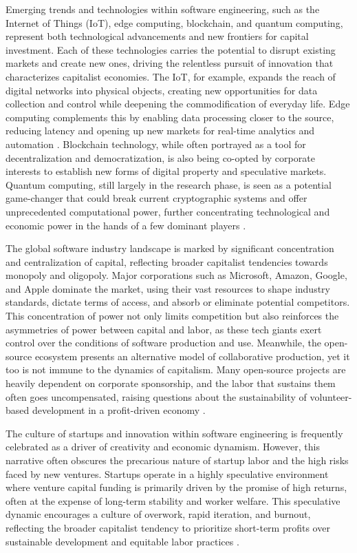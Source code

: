 \begin{refsection}
Emerging trends and technologies within software engineering, such as the Internet of Things (IoT), edge computing, blockchain, and quantum computing, represent both technological advancements and new frontiers for capital investment. Each of these technologies carries the potential to disrupt existing markets and create new ones, driving the relentless pursuit of innovation that characterizes capitalist economies. The IoT, for example, expands the reach of digital networks into physical objects, creating new opportunities for data collection and control while deepening the commodification of everyday life. Edge computing complements this by enabling data processing closer to the source, reducing latency and opening up new markets for real-time analytics and automation \cite[pp.~78-80]{benkler2006wealth}. Blockchain technology, while often portrayed as a tool for decentralization and democratization, is also being co-opted by corporate interests to establish new forms of digital property and speculative markets. Quantum computing, still largely in the research phase, is seen as a potential game-changer that could break current cryptographic systems and offer unprecedented computational power, further concentrating technological and economic power in the hands of a few dominant players \cite[pp.~112-114]{zuboff2019age}.

The global software industry landscape is marked by significant concentration and centralization of capital, reflecting broader capitalist tendencies towards monopoly and oligopoly. Major corporations such as Microsoft, Amazon, Google, and Apple dominate the market, using their vast resources to shape industry standards, dictate terms of access, and absorb or eliminate potential competitors. This concentration of power not only limits competition but also reinforces the asymmetries of power between capital and labor, as these tech giants exert control over the conditions of software production and use. Meanwhile, the open-source ecosystem presents an alternative model of collaborative production, yet it too is not immune to the dynamics of capitalism. Many open-source projects are heavily dependent on corporate sponsorship, and the labor that sustains them often goes uncompensated, raising questions about the sustainability of volunteer-based development in a profit-driven economy \cite[pp.~85-87]{stallman2010free}.

The culture of startups and innovation within software engineering is frequently celebrated as a driver of creativity and economic dynamism. However, this narrative often obscures the precarious nature of startup labor and the high risks faced by new ventures. Startups operate in a highly speculative environment where venture capital funding is primarily driven by the promise of high returns, often at the expense of long-term stability and worker welfare. This speculative dynamic encourages a culture of overwork, rapid iteration, and burnout, reflecting the broader capitalist tendency to prioritize short-term profits over sustainable development and equitable labor practices \cite[pp.~163-165]{schiller2011digital}.


\end{refsection}
